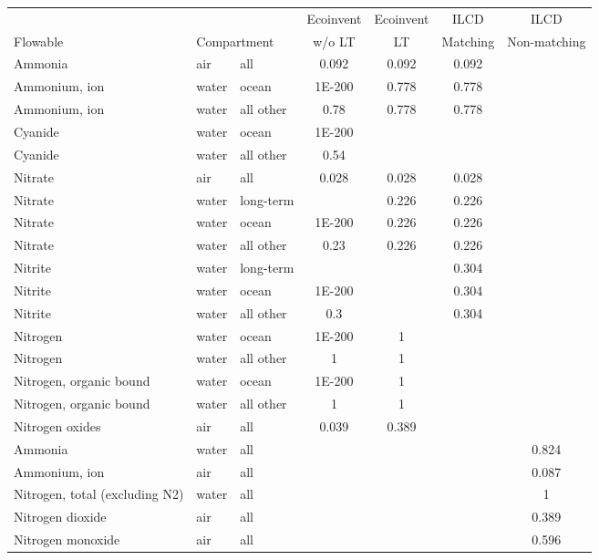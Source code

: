 \def\subcompartments{}
\begin{tabularx}{\textwidth}{Xllcccc}
  \toprule
  & & & Ecoinvent & Ecoinvent & ILCD & ILCD \\
 Flowable & \multicolumn{2}{l}{Compartment} & w/o LT & LT & Matching & Non-matching \\
  \midrule

Ammonia & air & all \subcompartments & 0.092 & 0.092 & 0.092 &  \\
Ammonium, ion & water & ocean & 1E-200 & 0.778 & 0.778 &  \\
Ammonium, ion & water & all other \subcompartments & 0.78 & 0.778 & 0.778 & \\[1ex]
Cyanide & water & ocean & 1E-200 &  &  & \\
Cyanide & water & all other \subcompartments & 0.54 &  &  & \\[1ex]
Nitrate & air & all \subcompartments & 0.028 & 0.028 & 0.028 & \\
Nitrate & water & long-term &  & 0.226 & 0.226 & \\
Nitrate & water & ocean & 1E-200 & 0.226 & 0.226 & \\
Nitrate & water & all other \subcompartments & 0.23 & 0.226 & 0.226 & \\[1ex]
Nitrite & water & long-term &  &  & 0.304 & \\
Nitrite & water & ocean & 1E-200 &  & 0.304 & \\
Nitrite & water & all other \subcompartments & 0.3 &  & 0.304 & \\[1ex]
Nitrogen & water & ocean & 1E-200 & 1 &  & \\
Nitrogen & water & all other \subcompartments & 1 & 1 &  & \\
Nitrogen, organic bound & water & ocean & 1E-200 & 1 &  & \\
Nitrogen, organic bound & water & all other \subcompartments & 1 & 1 &  & \\[1ex]
Nitrogen oxides & air & all \subcompartments & 0.039 & 0.389 &  & \\[1ex]
Ammonia & water & all \subcompartments &  &  &  & 0.824 \\
Ammonium, ion & air & all \subcompartments &  &  &  & 0.087 \\
Nitrogen, total (excluding N2) & water & all \subcompartments &  &  &  & 1 \\
Nitrogen dioxide & air & all \subcompartments &  &  &  & 0.389 \\
Nitrogen monoxide & air & all \subcompartments &  &  &  & 0.596 \\
\bottomrule
\end{tabularx}
